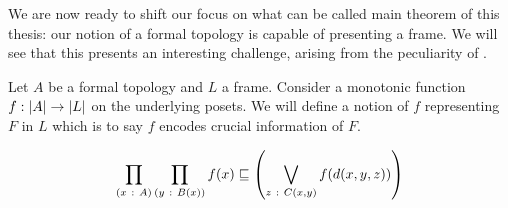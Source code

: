We are now ready to shift our focus on what can be called main theorem of this
thesis: our notion of a formal topology is capable of presenting a frame. We
will see that this presents an interesting challenge, arising from the
peculiarity of \UF{}.

Let $A$ be a formal topology and $L$ a frame. Consider a monotonic function $f : \left| A \right| \rightarrow
\left| L \right|$ on the underlying posets. We will define a notion of $f$ representing $F$ in $L$
which is to say $f$ encodes crucial information of $F$.

\begin{defn}[Representation]
  \begin{equation*}
  \prod_{(x~:~A)} \prod_{(y~:~B(x))} f(x) \sqsubseteq \left( \bigvee_{z~:~C(x, y)} f(d(x, y, z)) \right)
  \end{equation*}
\end{defn}

